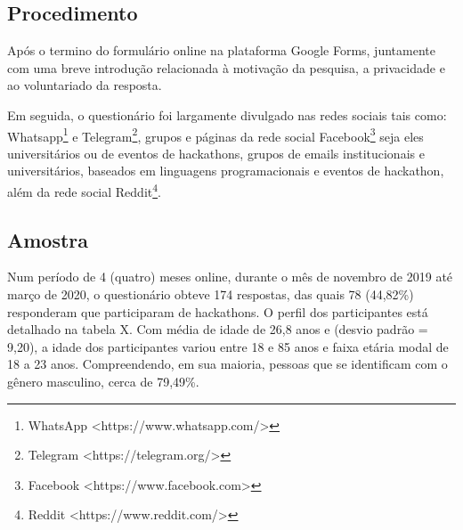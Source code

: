 \subsection{Procedimento}

Após o termino do formulário online na plataforma Google Forms, juntamente com uma breve introdução relacionada à motivação da pesquisa, a privacidade e ao voluntariado da resposta. 

Em seguida, o questionário foi largamente divulgado nas redes sociais tais como: Whatsapp\footnote{ WhatsApp <https://www.whatsapp.com/> } e Telegram\footnote{ Telegram <https://telegram.org/>}, grupos e páginas da rede social Facebook\footnote{ Facebook <https://www.facebook.com>} seja eles universitários ou de eventos de hackathons, grupos de emails institucionais e universitários, baseados em linguagens programacionais e eventos de hackathon, além da rede social Reddit\footnote{ Reddit <https://www.reddit.com/>}. 


\subsection{Amostra}

Num período de 4 (quatro) meses online, durante o mês de novembro de 2019 até março de 2020, o questionário obteve 174 respostas, das quais 78 (44,82\%) responderam que participaram de hackathons. 
O perfil dos participantes está detalhado na tabela X. Com média de idade de 26,8 anos e (desvio padrão = 9,20), a idade dos participantes variou entre 18 e 85 anos e faixa etária modal de 18 a 23 anos. Compreendendo, em sua maioria, pessoas que se identificam com o gênero masculino, cerca de 79,49\%.

